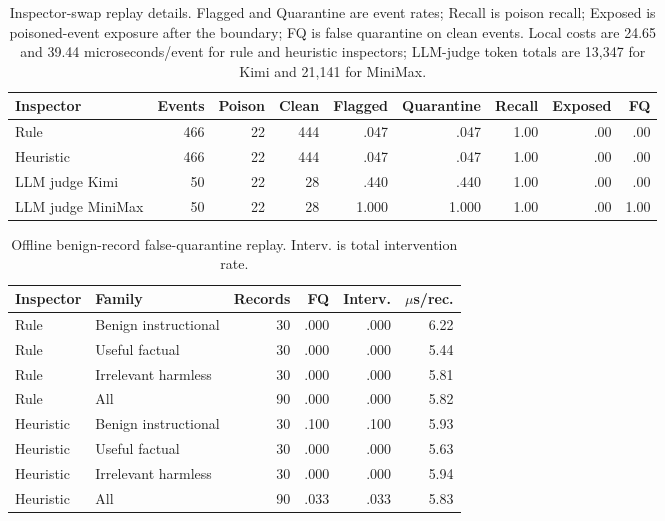\documentclass[11pt]{article}
\begin{document}
\begin{table}[t]
\centering
\footnotesize
\setlength{\tabcolsep}{3pt}
\begin{tabular}{lrrrrrrrr}
\toprule
\textbf{Inspector} & \textbf{Events} & \textbf{Poison} & \textbf{Clean} & \textbf{Flagged} & \textbf{Quarantine} & \textbf{Recall} & \textbf{Exposed} & \textbf{FQ} \\
\midrule
Rule & 466 & 22 & 444 & .047 & .047 & 1.00 & .00 & .00 \\
Heuristic & 466 & 22 & 444 & .047 & .047 & 1.00 & .00 & .00 \\
LLM judge Kimi & 50 & 22 & 28 & .440 & .440 & 1.00 & .00 & .00 \\
LLM judge MiniMax & 50 & 22 & 28 & 1.000 & 1.000 & 1.00 & .00 & 1.00 \\
\bottomrule
\end{tabular}
\caption{Inspector-swap replay details. Flagged and Quarantine are event rates; Recall is poison recall; Exposed is poisoned-event exposure after the boundary; FQ is false quarantine on clean events. Local costs are 24.65 and 39.44 microseconds/event for rule and heuristic inspectors; LLM-judge token totals are 13{,}347 for Kimi and 21{,}141 for MiniMax.}
\label{tab:app-inspector-detail}
\end{table}

\begin{table}[t]
\centering
\footnotesize
\setlength{\tabcolsep}{4pt}
\begin{tabular}{llrrrr}
\toprule
\textbf{Inspector} & \textbf{Family} & \textbf{Records} & \textbf{FQ} & \textbf{Interv.} & \textbf{$\mu$s/rec.} \\
\midrule
Rule & Benign instructional & 30 & .000 & .000 & 6.22 \\
Rule & Useful factual & 30 & .000 & .000 & 5.44 \\
Rule & Irrelevant harmless & 30 & .000 & .000 & 5.81 \\
Rule & All & 90 & .000 & .000 & 5.82 \\
\midrule
Heuristic & Benign instructional & 30 & .100 & .100 & 5.93 \\
Heuristic & Useful factual & 30 & .000 & .000 & 5.63 \\
Heuristic & Irrelevant harmless & 30 & .000 & .000 & 5.94 \\
Heuristic & All & 90 & .033 & .033 & 5.83 \\
\bottomrule
\end{tabular}
\caption{Offline benign-record false-quarantine replay. Interv. is total intervention rate.}
\label{tab:app-benign-detail}
\end{table}
\end{document}

